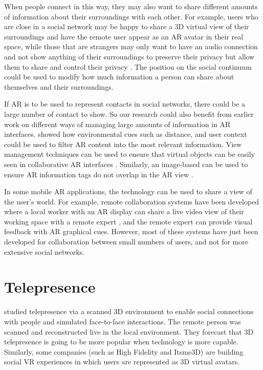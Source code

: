When people connect in this way, they may also want to share different amounts of information about their surroundings with each other. For example, users who are close in a social network may be happy to share a 3D virtual view of their surroundings and have the remote user appear as an AR avatar in their real space, while those that are strangers may only want to have an audio connection and not show anything of their surroundings to preserve their privacy but allow them to share and control their privacy \cite{Oetzel2011}. The position on the social continuum could be used to modify how much information a person can share about themselves and their surroundings.

If AR is to be used to represent contacts in social networks, there could be a large number of contact to show. So our research could also benefit from earlier work on different ways of managing large amounts of information in AR interfaces. \cite{Julier2002} showed how environmental cues such as distance, and user context could be used to filter AR content into the most relevant information. View management techniques can be used to ensure that virtual objects can be easily seen in collaborative AR interfaces \cite{Hollerer2001}. Similarly, an image-based can be used to ensure AR information tags do not overlap in the AR view \cite{Grasset2012}. 

In some mobile AR applications, the technology can be used to share a view of the user's world. For example, remote collaboration systems have been developed where a local worker with an AR display can share a live video view of their working space with a remote expert \cite{Billinghurst2002}, and the remote expert can provide visual feedback with AR graphical cues. However, most of these systems have just been developed for collaboration between small numbers of users, and not for more extensive social networks.

\section{Telepresence}


\cite{Fuchs2014} studied telepresence via a scanned 3D environment to enable social connections with people and simulated face-to-face interactions. The remote person was scanned and reconstructed live in the local environment. They forecast that 3D telepresence is going to be more popular when technology is more capable. Similarly, some companies (such as High Fidelity and Itsme3D) are building social VR experiences in which users are represented as 3D virtual avatars.



